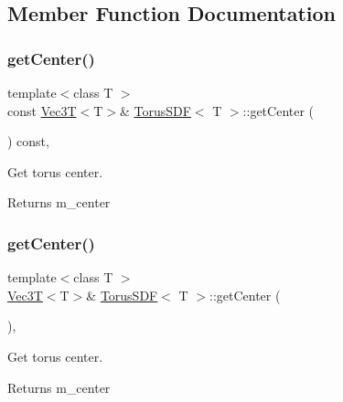 \subsection{Member Function Documentation}
\mbox{\label{classTorusSDF_a0973ae5f9e4a023ae15728d0a5063b4d}} 
\subsubsection{\texorpdfstring{get\+Center()}{getCenter()}\hspace{0.1cm}{\footnotesize\ttfamily [1/2]}}
{\footnotesize\ttfamily template$<$class T $>$ \\
const \hyperlink{classVec3T}{Vec3T}$<$T$>$\& \hyperlink{classTorusSDF}{Torus\+S\+DF}$<$ T $>$\+::get\+Center (\begin{DoxyParamCaption}{ }\end{DoxyParamCaption}) const\hspace{0.3cm}{\ttfamily [inline]}, {\ttfamily [noexcept]}}



Get torus center. 

\begin{DoxyReturn}{Returns}
m\+\_\+center 
\end{DoxyReturn}
\mbox{\label{classTorusSDF_ad4a6d109ff640e2cb003901bf6ac1c85}} 
\subsubsection{\texorpdfstring{get\+Center()}{getCenter()}\hspace{0.1cm}{\footnotesize\ttfamily [2/2]}}
{\footnotesize\ttfamily template$<$class T $>$ \\
\hyperlink{classVec3T}{Vec3T}$<$T$>$\& \hyperlink{classTorusSDF}{Torus\+S\+DF}$<$ T $>$\+::get\+Center (\begin{DoxyParamCaption}{ }\end{DoxyParamCaption})\hspace{0.3cm}{\ttfamily [inline]}, {\ttfamily [noexcept]}}



Get torus center. 

\begin{DoxyReturn}{Returns}
m\+\_\+center 
\end{DoxyReturn}
\mbox{\label{classTorusSDF_acf871d02fb580a9c33d6c54517730036}} 
